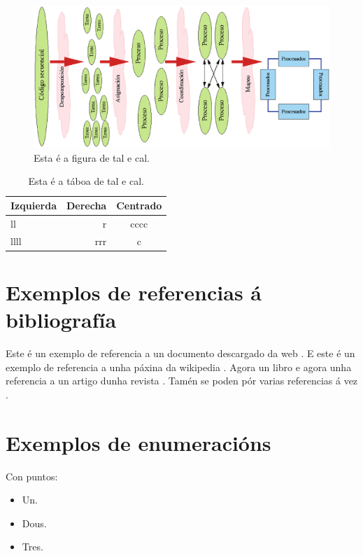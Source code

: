 \begin{figure}
\centerline{\includegraphics[width=15cm]{figuras/figura01.eps}}
\caption{Esta é a figura de tal e cal.}
\label{enlace1}
\end{figure}

\begin{table}
\begin{center}
\begin{tabular}{|l||r|c|} \hline
Izquierda & Derecha & Centrado  \\ \hline\hline
ll & r & cccc \\ \hline
llll & rrr & c \\ \hline
\end{tabular}
\caption{Esta é a táboa de tal e cal.}
\label{enlace2}
\end{center}
\end{table}

\section{Exemplos de referencias á bibliografía}
Este é un exemplo de referencia a un documento descargado da web \cite{cuda}. E este é un exemplo de referencia a unha páxina da wikipedia \cite{cdma}. Agora un libro \cite{gonzalez} e agora unha referencia a un artigo dunha revista \cite{patricia}. Tamén se poden pór varias referencias á vez \cite{cuda,gonzalez}.

\section{Exemplos de enumeracións}

Con puntos:

\begin{itemize}
\item Un.
\item Dous.
\item Tres.
\end{itemize}

